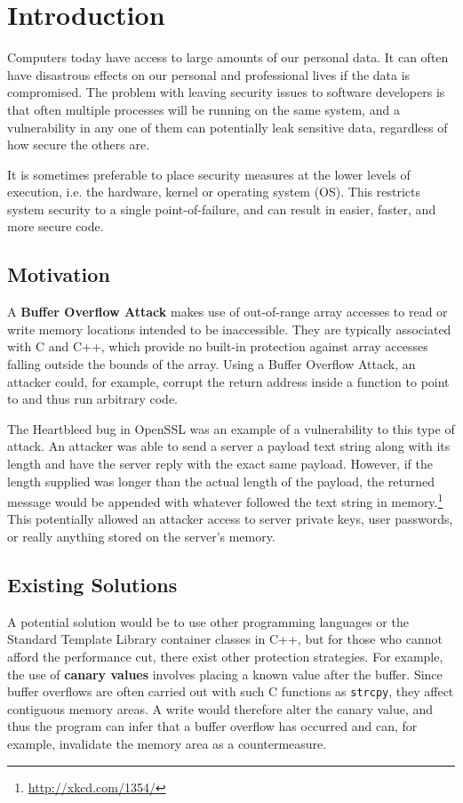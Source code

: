 \chapter{Introduction}
Computers today have access to large amounts of our personal data. It can often have disastrous effects on our personal and professional lives if the data is compromised. The problem with leaving security issues to software developers is that often multiple processes will be running on the same system, and a vulnerability in any one of them can potentially leak sensitive data, regardless of how secure the others are.

It is sometimes preferable to place security measures at the lower levels of execution, i.e. the hardware, kernel or operating system (OS). This restricts system security to a single point-of-failure, and can result in easier, faster, and more secure code.

\section{Motivation}
A \textbf{Buffer Overflow Attack} makes use of out-of-range array accesses to read or write memory locations intended to be inaccessible. They are typically associated with C and C++, which provide no built-in protection against array accesses falling outside the bounds of the array. Using a Buffer Overflow Attack, an attacker could, for example, corrupt the return address inside a function to point to and thus run arbitrary code.

The Heartbleed bug in OpenSSL\cite{heartbleed} was an example of a vulnerability to this type of attack. An attacker was able to send a server a payload text string along with its length and have the server reply with the exact same payload. However, if the length supplied was longer than the actual length of the payload, the returned message would be appended with whatever followed the text string in memory.\footnote{\url{http://xkcd.com/1354/}} This potentially allowed an attacker access to server private keys, user passwords, or really anything stored on the server's memory.

\section{Existing Solutions}
A potential solution would be to use other programming languages or the Standard Template Library container classes in C++, but for those who cannot afford the performance cut, there exist other protection strategies. For example, the use of \textbf{canary values} involves placing a known value after the buffer. Since buffer overflows are often carried out with such C functions as \verb|strcpy|, they affect contiguous memory areas. A write would therefore alter the canary value, and thus the program can infer that a buffer overflow has occurred and can, for example, invalidate the memory area as a countermeasure.

